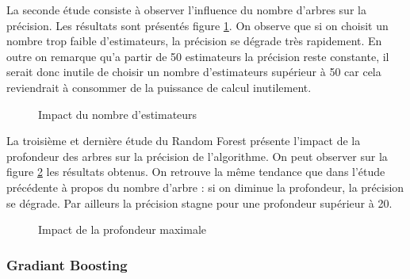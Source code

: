 \documentclass[11pt,a4paper]{article}
\begin{document}
			La seconde étude consiste à observer l'influence du nombre d'arbres sur la précision. Les résultats sont présentés figure \ref{rf_estimators}. On observe que si on choisit un nombre trop faible d'estimateurs, la précision se dégrade très rapidement. En outre on remarque qu'a partir de 50 estimateurs la précision reste constante, il serait donc inutile de choisir un nombre d'estimateurs supérieur à 50 car cela reviendrait à consommer de la puissance de calcul inutilement.

			\begin{figure}
			\begin{center}
				\caption{Impact du nombre d'estimateurs}
				\label{rf_estimators}
			\end{center}
			\end{figure}


			La troisième et dernière étude du Random Forest présente l'impact de la profondeur des arbres sur la précision de l'algorithme. On peut observer sur la figure \ref{rf_depth} les résultats obtenus. On retrouve la même tendance que dans l'étude précédente à propos du nombre d'arbre : si on diminue la profondeur, la précision se dégrade. Par ailleurs la précision stagne pour une profondeur supérieur à 20.

			\begin{figure}
				\begin{center}
					\caption{Impact de la profondeur maximale}
					\label{rf_depth}
				\end{center}
			\end{figure}

		\subsubsection{Gradiant Boosting}
\end{document}
